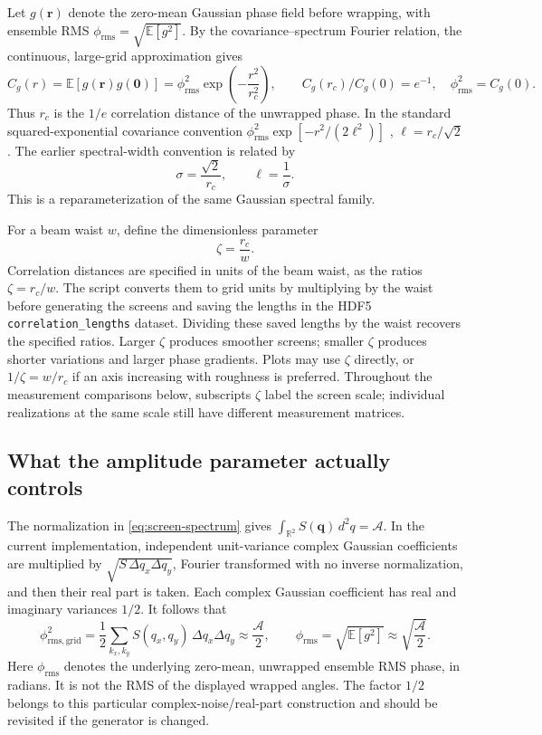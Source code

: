 \documentclass[11pt,a4paper]{article}
\newcommand{\R}{\mathbb R}
\newcommand{\E}{\mathbb E}
\begin{document}
Let $g(\mathbf r)$ denote the zero-mean Gaussian phase field before wrapping,
with ensemble RMS $\phi_{\mathrm{rms}}=\sqrt{\E[g^2]}$.
By the covariance--spectrum Fourier relation, the continuous, large-grid
approximation gives
\begin{equation}
 C_g(r)=\E[g(\mathbf r)g(\mathbf0)]
 =\phi_{\mathrm{rms}}^2\exp\!\left(-\frac{r^2}{r_c^2}\right),
 \qquad \boxed{C_g(r_c)/C_g(0)=e^{-1}},\quad \phi_{\mathrm{rms}}^2=C_g(0).
 \label{eq:phase-covariance}
\end{equation}
Thus $r_c$ is the $1/e$ correlation distance of the unwrapped phase.
In the standard squared-exponential covariance convention
$\phi_{\mathrm{rms}}^2\exp[-r^2/(2\ell^2)]$ \cite{rasmussen2006}, $\ell=r_c/\sqrt2$.
The earlier spectral-width convention is related by
\begin{equation}
 \sigma=\frac{\sqrt2}{r_c},\qquad \ell=\frac1\sigma.
\end{equation}
This is a reparameterization of the same Gaussian spectral family.

For a beam waist $w$, define the dimensionless parameter
\begin{equation}
 \boxed{\zeta=\frac{r_c}{w}.}
\end{equation}
Correlation distances are specified in units of the beam waist, as the
ratios $\zeta=r_c/w$. The script converts them to grid units by multiplying
by the waist before generating the screens and saving the lengths in the
HDF5 \texttt{correlation\_lengths} dataset. Dividing these saved lengths by
the waist recovers the specified ratios. Larger $\zeta$ produces
smoother screens; smaller $\zeta$ produces shorter variations and larger
phase gradients. Plots may use $\zeta$ directly, or $1/\zeta=w/r_c$ if an
axis increasing with roughness is preferred. Throughout the measurement
comparisons below, subscripts $\zeta$ label the screen scale; individual
realizations at the same scale still have different measurement matrices.

\subsection{What the amplitude parameter actually controls}
The normalization in \eqref{eq:screen-spectrum} gives
$\int_{\R^2}S(\mathbf q)\,d^2q=\mathcal A$. In the current implementation,
independent unit-variance complex Gaussian coefficients are multiplied by
$\sqrt{S\,\Delta q_x\Delta q_y}$, Fourier transformed with no inverse
normalization, and then their real part is taken. Each complex Gaussian
coefficient has real and imaginary variances $1/2$. It follows that
\begin{equation}
 \phi_{\mathrm{rms,grid}}^2=\frac12\sum_{k_x,k_y}
 S(q_x,q_y)\,\Delta q_x\Delta q_y
 \approx\frac{\mathcal A}{2},\qquad
 \boxed{\phi_{\mathrm{rms}}=\sqrt{\E[g^2]}
 \approx\sqrt{\frac{\mathcal A}{2}}.}
 \label{eq:phase-rms}
\end{equation}
Here $\phi_{\mathrm{rms}}$ denotes the underlying zero-mean, unwrapped
ensemble RMS phase, in radians. It is not the RMS of the displayed wrapped
angles. The factor $1/2$ belongs to this particular complex-noise/real-part
construction and should be revisited if the generator is changed.
\end{document}
